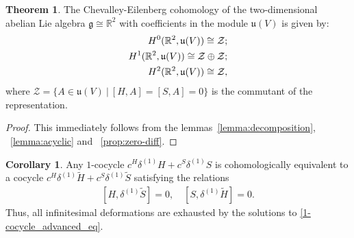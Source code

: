 \documentclass[10pt,a4paper]{amsart}
\theoremstyle{definition}
\newtheorem{theorem}[remark]{Theorem}
\newtheorem{corollary}[remark]{Corollary}
\begin{document}
\begin{theorem} \label{thm:cohomologies}
    The Chevalley-Eilenberg cohomology of the two-dimensional abelian Lie algebra $\mathfrak{g}\cong\mathbb{R}^2$ with coefficients in the module $\mathfrak{u}(V)$ is given by:
    \begin{eqnarray}
        \notag
        H^0(\mathbb{R}^2, \mathfrak{u}(V)) \cong \mathcal{Z}; \\
        \notag
            H^1(\mathbb{R}^2, \mathfrak{u}(V)) \cong \mathcal{Z} \oplus \mathcal{Z}; \\
            H^2(\mathbb{R}^2, \mathfrak{u}(V)) \cong \mathcal{Z},
    \end{eqnarray}
    where $\mathcal{Z}=\{A\in\mathfrak{u}(V)\ |\  [H,A]=[S,A]=0\}$ is the commutant of the representation.
    \begin{proof}
        This immediately follows from the lemmas~\ref{lemma:decomposition}, ~\ref{lemma:acyclic} and ~\ref{prop:zero-diff}.
    \end{proof}
\end{theorem}
\begin{corollary}
    Any $1$-cocycle $c^{H}\delta^{(1)}H+c^{S}\delta^{(1)}S$ is cohomologically equivalent to a cocycle $c^{H}\delta^{(1)}\tilde{H}+c^{S}\delta^{(1)}\tilde{S}$ satisfying the relations
    \begin{equation}
    \begin{aligned}
    \label{1-cocycle_advanced_eq}
        [H, \delta^{(1)}\tilde{S}]=0,\quad [S,\delta^{(1)}\tilde{H}]=0.
    \end{aligned}
    \end{equation}
    Thus, all infinitesimal deformations are exhausted by the solutions to \eqref{1-cocycle_advanced_eq}.
\end{corollary}
\end{document}
